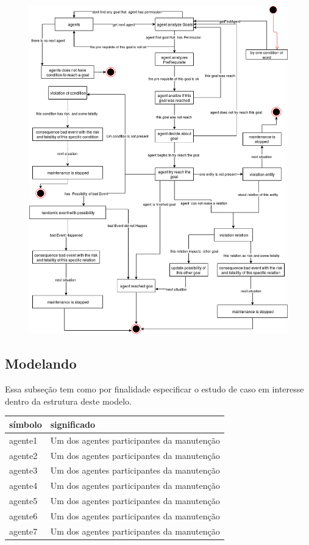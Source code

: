 \documentclass[12pt]{article}
\begin{document}
\begin{figure}[H]
  \centering
  \includegraphics[width=0.8\linewidth]{DiagramaDeEstados} 
  \caption{}
  \label{state}
\end{figure}

\subsection{Modelando}

Essa subseção tem como por finalidade especificar o estudo de caso em interesse dentro da estrutura deste modelo. 

\begin{table}[H]
\centering
\begin{tabular}{|l|l|}
\hline
\textbf{símbolo} & \textbf{significado} \\ \hline
agente1 & Um dos agentes participantes da manutenção \\ \hline
agente2 & Um dos agentes participantes da manutenção \\ \hline
agente3 & Um dos agentes participantes da manutenção \\ \hline
agente4 & Um dos agentes participantes da manutenção \\ \hline
agente5 & Um dos agentes participantes da manutenção \\ \hline
agente6 & Um dos agentes participantes da manutenção \\ \hline
agente7 & Um dos agentes participantes da manutenção \\ \hline
\end{tabular}
\end{table}
\end{document}
